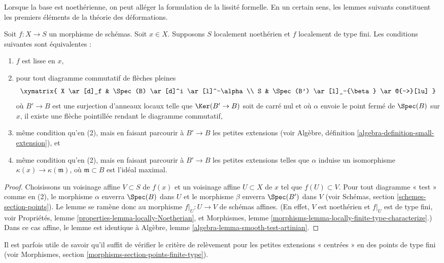 \noindent
Lorsque la base est noethérienne, on peut alléger
la formulation de la lissité formelle. En un certain sens, les lemmes suivants
constituent les premiers éléments de la théorie des déformations.

\begin{lemma}
\label{lemma-lifting-along-artinian-at-point}
Soit $f : X \to S$ un morphisme de schémas.
Soit $x \in X$.
Supposons $S$ localement noethérien et $f$ localement de type fini.
Les conditions suivantes sont équivalentes :
\begin{enumerate}
\item $f$ est lisse en $x$,
\item pour tout diagramme commutatif de flèches pleines
$$
\xymatrix{
X \ar[d]_f & \Spec(B) \ar[d]^i \ar[l]^-\alpha \\
S & \Spec(B') \ar[l]_-{\beta} \ar@{-->}[lu]
}
$$
où $B' \to B$ est une surjection d'anneaux locaux telle que
$\Ker(B' \to B)$ soit de carré nul et où $\alpha$ envoie le
point fermé de $\Spec(B)$ sur $x$, il existe
une flèche pointillée rendant le diagramme commutatif,
\item même condition qu'en (2), mais en faisant parcourir à $B' \to B$ les petites
extensions (voir Algèbre, définition \ref{algebra-definition-small-extension}),
et
\item même condition qu'en (2), mais en faisant parcourir à $B' \to B$ les petites
extensions telles que $\alpha$ induise un isomorphisme
$\kappa(x) \to \kappa(\mathfrak m)$, où $\mathfrak m \subset B$
est l'idéal maximal.
\end{enumerate}
\end{lemma}

\begin{proof}
Choisissons un voisinage affine $V \subset S$ de $f(x)$ et un
voisinage affine $U \subset X$ de $x$ tel que $f(U) \subset V$.
Pour tout diagramme « test » comme en (2), le morphisme $\alpha$ enverra
$\Spec(B)$ dans $U$ et le morphisme $\beta$ enverra $\Spec(B')$
dans $V$ (voir Schémas, section \ref{schemes-section-points}).
Le lemme se ramène donc au morphisme $f|_U : U \to V$ de schémas affines.
(En effet, $V$ est noethérien et $f|_U$ est de type fini, voir
Propriétés, lemme \ref{properties-lemma-locally-Noetherian}, et
Morphismes, lemme \ref{morphisms-lemma-locally-finite-type-characterize}.)
Dans ce cas affine, le lemme est identique à
Algèbre, lemme \ref{algebra-lemma-smooth-test-artinian}.
\end{proof}

\noindent
Il est parfois utile de savoir qu'il suffit de vérifier le
critère de relèvement pour les petites extensions « centrées » en des points
de type fini (voir
Morphismes, section \ref{morphisms-section-points-finite-type}).

